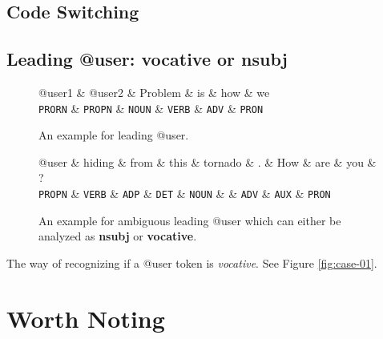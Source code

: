 \documentclass[11pt,a4paper]{article}
\begin{document}
\subsection{Code Switching}

\subsection{Leading @user: vocative or nsubj}
\begin{figure}[t]
	\centering
	\small
	\begin{dependency}[edge slant=2, text only label, label style=above]
		\begin{deptext}
			@user1  \& @user2 \& Problem \& is \& how \& we \\
			\texttt{PRORN} \& \texttt{PROPN} \& \texttt{NOUN} \& \texttt{VERB} \& \texttt{ADV} \& \texttt{PRON} \\
		\end{deptext}
	\end{dependency}
	\caption{An example for leading @user.}\label{fig:vocative}
\end{figure}

\begin{figure}[t]
	\centering
	\small
	\begin{dependency}[edge slant=2, text only label, label style=above]
		\begin{deptext}
			@user  \& hiding \& from \& this \& tornado \& . \& How \& are \& you \& ? \\
			\texttt{PROPN} \& \texttt{VERB} \& \texttt{ADP} \& \texttt{DET} \& \texttt{NOUN} \& \& \texttt{ADV} \& \texttt{AUX} \& \texttt{PRON} \\
		\end{deptext}
	\end{dependency}
	\caption{An example for ambiguous leading @user which can either be analyzed as \textbf{nsubj} or \textbf{vocative}.}\label{fig:abnormal-vocative}
\end{figure}

The way of recognizing if a @user token is \textit{vocative}.
See Figure \ref{fig:case-01}.


\section{Worth Noting}
\end{document}
